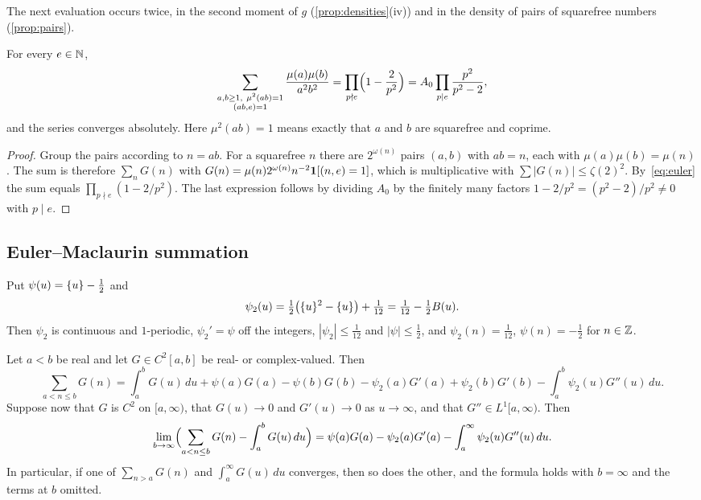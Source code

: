 The next evaluation occurs twice, in the second moment of $g$ (\cref{prop:densities}(iv)) and in the density of pairs of squarefree numbers (\cref{prop:pairs}).

\begin{lemma}\label{lem:pairs-euler}
For every $e\in\mathbb{N}$,
\[
\sum_{\substack{a,b\ge1,\ \mu^2(ab)=1\\ (ab,e)=1}}\frac{\mu(a)\mu(b)}{a^2b^2}
=\prod_{p\nmid e}\Bigl(1-\frac2{p^2}\Bigr)=A_0\prod_{p\mid e}\frac{p^2}{p^2-2},
\]
and the series converges absolutely. Here $\mu^2(ab)=1$ means exactly that $a$ and $b$ are squarefree and coprime.
\end{lemma}

\begin{proof}
Group the pairs according to $n=ab$. For a squarefree $n$ there are $2^{\omega(n)}$ pairs $(a,b)$ with $ab=n$, each with $\mu(a)\mu(b)=\mu(n)$. The sum is therefore $\sum_{n}G(n)$ with $G(n)=\mu(n)2^{\omega(n)}n^{-2}\mathbf{1}[(n,e)=1]$, which is multiplicative with $\sum|G(n)|\le\zeta(2)^2$. By~\eqref{eq:euler} the sum equals $\prod_{p\nmid e}(1-2/p^2)$. The last expression follows by dividing $A_0$ by the finitely many factors $1-2/p^2=(p^2-2)/p^2\ne0$ with $p\mid e$.
\end{proof}

\subsection{Euler--Maclaurin summation}

Put $\psi(u)=\{u\}-\frac12$ and
\begin{equation}\label{eq:psi2}
\psi_2(u)=\tfrac12\bigl(\{u\}^2-\{u\}\bigr)+\tfrac1{12}=\tfrac1{12}-\tfrac12B(u).
\end{equation}
Then $\psi_2$ is continuous and $1$-periodic, $\psi_2'=\psi$ off the integers, $|\psi_2|\le\frac1{12}$ and $|\psi|\le\frac12$, and $\psi_2(n)=\frac1{12}$, $\psi(n)=-\frac12$ for $n\in\mathbb{Z}$.

\begin{lemma}\label{lem:EM}
Let $a<b$ be real and let $G\in C^2[a,b]$ be real- or complex-valued. Then
\[
\sum_{a<n\le b}G(n)=\int_a^bG(u)\,du+\psi(a)G(a)-\psi(b)G(b)-\psi_2(a)G'(a)+\psi_2(b)G'(b)-\int_a^b\psi_2(u)G''(u)\,du .
\]
Suppose now that $G$ is $C^2$ on $[a,\infty)$, that $G(u)\to0$ and $G'(u)\to0$ as $u\to\infty$, and that $G''\in L^1[a,\infty)$. Then
\[
\lim_{b\to\infty}\Bigl(\sum_{a<n\le b}G(n)-\int_a^bG(u)\,du\Bigr)=\psi(a)G(a)-\psi_2(a)G'(a)-\int_a^\infty\psi_2(u)G''(u)\,du .
\]
In particular, if one of $\sum_{n>a}G(n)$ and $\int_a^\infty G(u)\,du$ converges, then so does the other, and the formula holds with $b=\infty$ and the terms at $b$ omitted.
\end{lemma}

